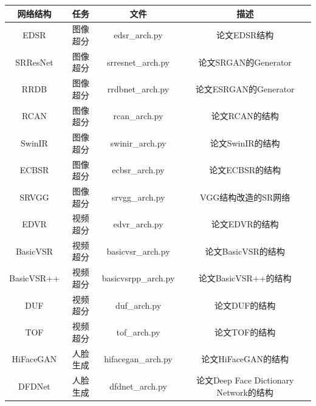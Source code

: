 \documentclass[../main.tex]{subfiles}
\begin{document}
\begin{table}[h]
    \centering
    {
        \begin{tabular}{|c|c|c|c|}
            \hline
            \textbf{网络结构} & \textbf{任务} & \textbf{文件}          & \textbf{描述}                          \\ \hline
            EDSR              & 图像超分      & edsr\_arch.py          & 论文EDSR结构                           \\ \hline
            SRResNet          & 图像超分      & srresnet\_arch.py      & 论文SRGAN的Generator                   \\ \hline
            RRDB              & 图像超分      & rrdbnet\_arch.py       & 论文ESRGAN的Generator                  \\ \hline
            RCAN              & 图像超分      & rcan\_arch.py          & 论文RCAN的结构                         \\ \hline
            SwinIR            & 图像超分      & swinir\_arch.py        & 论文SwinIR的结构                       \\ \hline
            ECBSR             & 图像超分      & ecbsr\_arch.py         & 论文ECBSR的结构                        \\ \hline
            SRVGG             & 图像超分      & srvgg\_arch.py         & VGG结构改造的SR网络                    \\ \hline
            EDVR              & 视频超分      & edvr\_arch.py          & 论文EDVR的结构                         \\ \hline
            BasicVSR          & 视频超分      & basicvsr\_arch.py      & 论文BasicVSR的结构                     \\ \hline
            BasicVSR++        & 视频超分      & basicvsrpp\_arch.py    & 论文BasicVSR++的结构                   \\ \hline
            DUF               & 视频超分      & duf\_arch.py           & 论文DUF的结构                          \\ \hline
            TOF               & 视频超分      & tof\_arch.py           & 论文TOF的结构                          \\ \hline
            HiFaceGAN         & 人脸生成      & hifacegan\_arch.py     & 论文HiFaceGAN的结构                    \\ \hline
            DFDNet            & 人脸生成      & dfdnet\_arch.py        & 论文Deep Face Dictionary Network的结构 \\ \hline

\end{tabular}}
\end{table}
\end{document}
